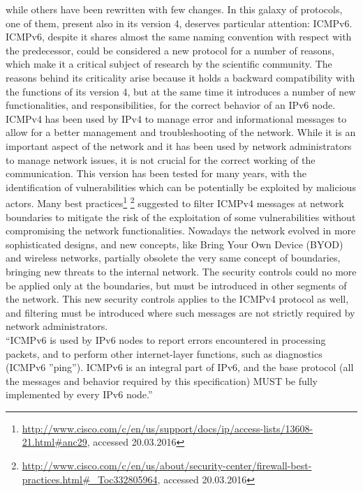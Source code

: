 \documentclass[12pt]{article}
\begin{document}
while others have been rewritten with few changes. In this galaxy of protocols, one of them, present also in its version 4, deserves particular attention: ICMPv6.\\
ICMPv6, despite it shares almost the same naming convention with respect with the predecessor, could be considered a new protocol for a number of reasons, which make it a critical subject of research by the scientific 
community. The reasons behind its criticality arise because it holds a backward compatibility with the functions of its version 4, but at the same time it introduces a number of new functionalities, and responsibilities, 
for the correct behavior of an IPv6 node.\\
ICMPv4 has been used by IPv4 to manage error and informational messages to allow for a better management and troubleshooting of the network. While it is an important aspect of the network and it has been used by network 
administrators to manage network issues, it is not crucial for the correct working of the communication. This version has been tested for many years, with the identification of vulnerabilities which can be 
potentially be exploited by malicious actors. Many best practices\footnote{\url{http://www.cisco.com/c/en/us/support/docs/ip/access-lists/13608-21.html\#anc29}, accessed 20.03.2016}
\footnote{\url{http://www.cisco.com/c/en/us/about/security-center/firewall-best-practices.html\#\_Toc332805964}, accessed 20.03.2016} 
suggested to filter ICMPv4 messages at network boundaries to mitigate the risk of the exploitation of some vulnerabilities without 
compromising the network functionalities. Nowadays the network evolved in more sophisticated designs, and new concepts, like Bring Your Own Device (BYOD) and wireless networks, partially obsolete the very same concept of boundaries, bringing new 
threats to the internal network. The security controls could no more be applied only at the boundaries, but must be introduced in other segments of the network. This new security controls applies to the ICMPv4 protocol 
as well, and filtering must be introduced where such messages are not strictly required by network administrators.\\
“ICMPv6 is used by IPv6 nodes to report errors encountered in processing packets, and to perform other internet-layer functions, such as diagnostics (ICMPv6 ”ping”). ICMPv6 is an integral part of IPv6, and the base 
protocol (all the messages and behavior required by this specification) MUST be fully implemented by every IPv6 node.”\cite{rfc4443}\\
\end{document}
